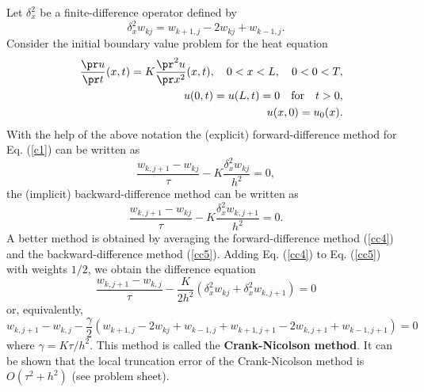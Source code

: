 Let $\delta_{x}^{2}$ be a finite-difference operator defined by
\begin{equation}
\delta_{x}^{2}w_{kj}=w_{k+1, j}-2w_{kj}+w_{k-1,j}. \label{cc0}
\end{equation}
Consider the initial boundary value problem for
the heat equation
\begin{eqnarray}
&&\frac{\pr u}{\pr t}(x,t) = K\frac{\pr^{2} u}{\pr x^{2}}(x,t), \quad
0<x< L, \quad 0<0<T,   \label{c1} \\
&&u(0, t) = u(L, t)=0 \quad \hbox{for} \quad t>0,   \label{c2} \\
&&u(x, 0) = u_{0}(x).   \label{c3}
\end{eqnarray}
With the help of the above notation the (explicit) forward-difference method for Eq. (\ref{c1}) can be written as
\begin{equation}
\frac{w_{k,j+1}-w_{kj}}{\tau}-K\frac{\delta_{x}^{2}w_{kj}}{h^2}=0, \label{cc4}
\end{equation}
the (implicit) backward-difference method can be written as
\begin{equation}
\frac{w_{k,j+1}-w_{kj}}{\tau}-K\frac{\delta_{x}^{2}w_{k,j+1}}{h^2}=0. \label{cc5}
\end{equation}
A better method is obtained by averaging the forward-difference
method (\ref{cc4}) and the backward-difference method (\ref{cc5}).
Adding Eq. (\ref{cc4}) to Eq. (\ref{cc5}) with weights $1/2$, we
obtain the difference equation
\begin{equation}
\frac{w_{k,j+1}-w_{k,j}}{\tau}- \frac{K}{2h^{2}}\left(
\delta_{x}^{2}w_{kj}+\delta_{x}^{2}w_{k,j+1}\right)=0 \label{qq14}
\end{equation}
or, equivalently,
\begin{equation}
w_{k,j+1}-w_{k,j}-\frac{\gamma}{2}\left( w_{k+1,
j}-2w_{kj}+w_{k-1,j}+ w_{k+1, j+1}-2w_{k,j+1}+w_{k-1,j+1}\right)=0
\label{qq15a}
\end{equation}
where $\gamma=K\tau/h^2$.
This method is called the {\bf Crank-Nicolson method}. It can be
shown that the local truncation error of the  Crank-Nicolson method
is $O(\tau^{2}+h^{2})$ (see problem sheet).

